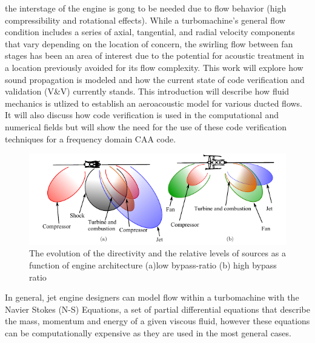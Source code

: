 the interstage of the engine is gong to be needed due to flow behavior (high compressibility
and rotational effects).  While a turbomachine's general flow condition includes 
a series of axial, tangential, and radial velocity components that vary
depending on the location of concern, the swirling flow between fan stages has 
been an area of interest due to the potential for acoustic treatment in a 
location previously avoided for its flow complexity. This work will explore how 
sound propagation is modeled and how the current state of code verification and 
validation (V\&V) currently stands. This introduction will describe how fluid mechanics
is utlized to establish an aeroacoustic model for various ducted flows. It will 
also discuss how code verification is used in the computational and numerical fields
but will show the need for the use of these code verification techniques for 
a frequency domain CAA code. 




\begin{figure}
    \centering
    \includegraphics[width=\textwidth]{Chapter-1-Introduction/Figures/lowVhighBPRdirectivitySMITH2004.png}
    \caption{ The evolution of the directivity and the 
    relative levels of sources as a function of engine architecture (a)low bypass-ratio (b) high bypass ratio \cite{smith1989aircraft}}
    \label{fig:intro}
\end{figure}


In general, jet engine designers can model flow within a turbomachine with 
the Navier Stokes (N-S) Equations, a set of partial differential equations that
describe the mass, momentum and energy of a given viscous fluid, however 
these equations can be computationally expensive as they are used in the most
general cases. 

